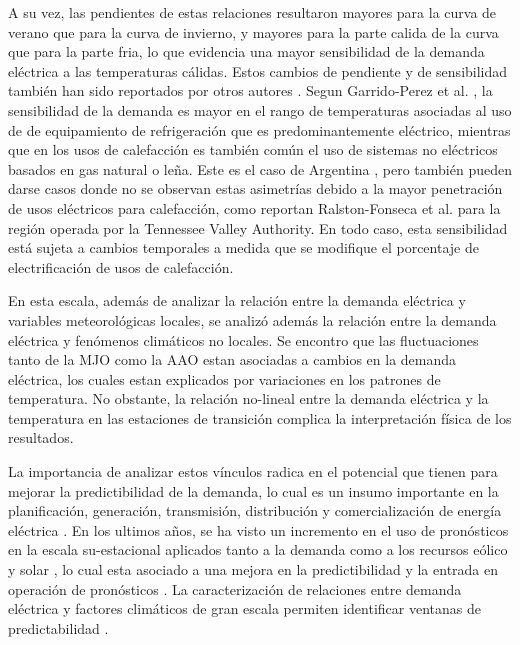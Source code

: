 \documentclass[11pt,a4paper]{article}
\begin{document}
A su vez, las pendientes de estas relaciones resultaron mayores para la curva de verano que para la curva de invierno, y mayores para la parte calida de la curva que para la parte fria, lo que evidencia una mayor sensibilidad de la demanda eléctrica a las temperaturas cálidas. Estos cambios de pendiente y de sensibilidad también han sido reportados por otros autores \cite{blazquez2013residential, damm2017impacts, wenz2017north, detemperatura}. Segun Garrido-Perez et al. \cite{garrido2021impact}, la sensibilidad de la demanda es mayor en el rango de temperaturas asociadas al uso de de equipamiento de refrigeración que es predominantemente eléctrico, mientras que en los usos de calefacción es también común el uso de sistemas no eléctricos basados en gas natural o leña. Este es el caso de Argentina \cite{detemperatura}, pero también pueden darse casos donde no se observan estas asimetrías debido a la mayor penetración de usos eléctricos para calefacción, como reportan Ralston-Fonseca et al. \cite{ralston2019seasonal} para la región operada por la Tennessee Valley Authority. En todo caso, esta sensibilidad está sujeta a cambios temporales a medida que se modifique el porcentaje de electrificación de usos de calefacción.

En esta escala, además de analizar la relación entre la demanda eléctrica y variables meteorológicas locales, se analizó además la relación entre la demanda eléctrica y fenómenos climáticos no locales. Se encontro que las fluctuaciones tanto de la MJO como la AAO estan asociadas a cambios en la demanda eléctrica, los cuales estan explicados por variaciones en los patrones de temperatura. No obstante, la relación no-lineal entre la demanda eléctrica y la temperatura en las estaciones de transición complica la interpretación física de los resultados. 

La importancia de analizar estos vínculos radica en el potencial que tienen para mejorar la predictibilidad de la demanda, lo cual es un insumo  importante en la planificación, generación, transmisión, distribución y comercialización de energía eléctrica \cite{zanek2022definicion}. En los ultimos años, se ha visto un incremento en el uso de pronósticos en la escala su-estacional aplicados tanto a la demanda \cite{clark2017skilful} como a los recursos eólico y solar \cite{soret2019sub,das2021evaluation, bett2022simplified, choi2024advancing}, lo cual  esta asociado a una mejora en la predictibilidad y la entrada en operación de pronósticos \cite{clark2017skilful, bloomfield2021sub}. La caracterización de relaciones entre demanda eléctrica y factores climáticos de gran escala permiten identificar ventanas de predictabilidad \cite{white2017potential}.  
\end{document}
